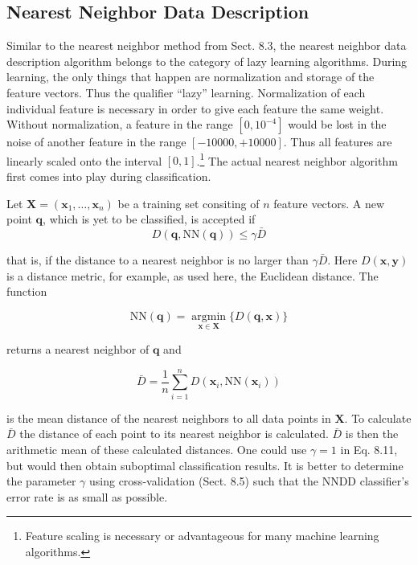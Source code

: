 \documentclass[10pt]{book}
\begin{document}
\subsection{Nearest Neighbor Data Description}
Similar to the nearest neighbor method from Sect. 8.3, the nearest neighbor data description algorithm belongs to the category of lazy learning algorithms. During learning, the only things that happen are normalization and storage of the feature vectors. Thus the qualifier ``lazy'' learning. Normalization of each individual feature is necessary in order to give each feature the same weight. Without normalization, a feature in the range $\left[0,10^{-4}\right]$ would be lost in the noise of another feature in the range $[-10000,+10000]$. Thus all features are linearly scaled onto the interval $[0,1]$.\footnote{Feature scaling is necessary or advantageous for many machine learning algorithms.} The actual nearest neighbor algorithm first comes into play during classification.

Let $\boldsymbol{X}=\left(\boldsymbol{x}_{1}, \ldots, \boldsymbol{x}_{n}\right)$ be a training set consiting of $n$ feature vectors. A new point $\boldsymbol{q}$, which is yet to be classified, is accepted if
\begin{equation*}
D(\boldsymbol{q}, \mathrm{NN}(\boldsymbol{q})) \leq \gamma \bar{D} \tag{8.11}
\end{equation*}

that is, if the distance to a nearest neighbor is no larger than $\gamma \bar{D}$. Here $D(\boldsymbol{x}, \boldsymbol{y})$ is a distance metric, for example, as used here, the Euclidean distance. The function

$$
\mathrm{NN}(\boldsymbol{q})=\underset{\boldsymbol{x} \in \boldsymbol{X}}{\operatorname{argmin}}\{D(\boldsymbol{q}, \boldsymbol{x})\}
$$

returns a nearest neighbor of $\boldsymbol{q}$ and

$$
\bar{D}=\frac{1}{n} \sum_{i=1}^{n} D\left(\boldsymbol{x}_{i}, \mathrm{NN}\left(\boldsymbol{x}_{i}\right)\right)
$$

is the mean distance of the nearest neighbors to all data points in $\boldsymbol{X}$. To calculate $\bar{D}$ the distance of each point to its nearest neighbor is calculated. $\bar{D}$ is then the arithmetic mean of these calculated distances. One could use $\gamma=1$ in Eq. 8.11, but would then obtain suboptimal classification results. It is better to determine the parameter $\gamma$ using cross-validation (Sect. 8.5) such that the NNDD classifier's error rate is as small as possible.
\end{document}
